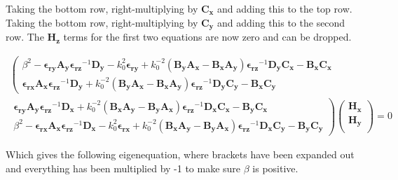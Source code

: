 \documentclass[]{article}
\begin{document}
Taking the bottom row, right-multiplying by $\mathbf{C_x}$ and adding this to the top row. Taking the bottom row, right-multiplying by $\mathbf{C_y}$ and adding this to the second row. The $\mathbf{H_z}$ terms for the first two equations are now zero and can be dropped.

\begin{multline*}
\left(
\begin{matrix}
\beta^2 - \mathbf{\epsilon_{ry}} \mathbf{A_y} \mathbf{\epsilon_{rz}}^{-1} \mathbf{D_y} - k_0^2 \mathbf{\epsilon_{ry}} + k_0^{-2} (\mathbf{B_y} \mathbf{A_x} - \mathbf{B_x} \mathbf{A_y}) \mathbf{\epsilon_{rz}}^{-1} \mathbf{D_y} \mathbf{C_x} - \mathbf{B_x} \mathbf{C_x}
\\
\mathbf{\epsilon_{rx}}  \mathbf{A_x} \mathbf{\epsilon_{rz}}^{-1} \mathbf{D_y}  + k_0^{-2} (\mathbf{B_y} \mathbf{A_x} - \mathbf{B_x} \mathbf{A_y}) \mathbf{\epsilon_{rz}}^{-1} \mathbf{D_y} \mathbf{C_y} - \mathbf{B_x} \mathbf{C_y}
\end{matrix}
\right.
\\
\left.
\begin{matrix}
\mathbf{\epsilon_{ry}} \mathbf{A_y} \mathbf{\epsilon_{rz}}^{-1} \mathbf{D_x} + k_0^{-2} (\mathbf{B_x} \mathbf{A_y} - \mathbf{B_y} \mathbf{A_x}) \mathbf{\epsilon_{rz}}^{-1} \mathbf{D_x} \mathbf{C_x} - \mathbf{B_y} \mathbf{C_x}
\\
\beta^2 - \mathbf{\epsilon_{rx}} \mathbf{A_x} \mathbf{\epsilon_{rz}}^{-1} \mathbf{D_x} - k_0^2 \mathbf{\epsilon_{rx}}  + k_0^{-2} (\mathbf{B_x} \mathbf{A_y} - \mathbf{B_y} \mathbf{A_x}) \mathbf{\epsilon_{rz}}^{-1} \mathbf{D_x} \mathbf{C_y} - \mathbf{B_y} \mathbf{C_y}
\end{matrix}
\right)
\begin{pmatrix}
\mathbf{H_x} \\
\mathbf{H_y} \\
\end{pmatrix}
=0
\end{multline*}

Which gives the following eigenequation, where brackets have been expanded out and everything has been multiplied by -1 to make sure $\beta$ is positive.
\end{document}

